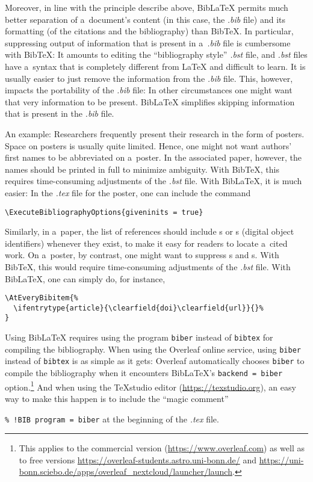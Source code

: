 \documentclass[12pt, a4paper, oneside]{article}
\newlength{\smalllinespacing}
\renewenvironment{quote}{%
	\par\list{}{%
		\leftmargin = \baselineskip%
		\rightmargin = \leftmargin%
		\baselineskip = \smalllinespacing%
	}
	\item\relax%
}{%
	\endlist%
}
\renewcommand{\caps}[1]{{\textscale{0.97}{\textls[50]{\MakeUppercase{#1}}}}}
\theoremstyle{Plain}
\theoremstyle{Definition}
\theoremstyle{Remark}
\begin{document}
Moreover, in line with the principle describe above, BibLaTeX permits much better separation of a~document's content (in this case, the \textit{.bib} file) and its formatting (of the citations and the bibliography) than BibTeX. In particular, suppressing output of information that is present in a~\textit{.bib} file is cumbersome with BibTeX: It amounts to editing the ``bibliography style'' \textit{.bst} file, and \textit{.bst} files have a~syntax that is completely different from LaTeX and difficult to learn. It is usually easier to just remove the information from the \textit{.bib} file. This, however, impacts the portability of the \textit{.bib} file: In other circumstances one might want that very information to be present. BibLaTeX simplifies skipping information that is present in the \textit{.bib} file.

An example: Researchers frequently present their research in the form of posters. Space on posters is usually quite limited. Hence, one might not want authors' first names to be abbreviated on a~poster. In the associated paper, however, the names should be printed in full to minimize ambiguity. With BibTeX, this requires time-consuming adjustments of the \textit{.bst} file. With BibLaTeX, it is much easier: In the \textit{.tex} file for the poster, one can include the command
\begin{quote}
	\verb|\ExecuteBibliographyOptions{giveninits = true}|
\end{quote}

Similarly, in a~paper, the list of references should include \caps{URL}s or \caps{DOI}s (digital object identifiers) whenever they exist, to make it easy for readers to locate a~cited work. On a~poster, by contrast, one might want to suppress \caps{DOI}s and \caps{URL}s. With BibTeX, this would require time-consuming adjustments of the \textit{.bst} file. With BibLaTeX, one can simply do, for instance,
\begin{quote}
\begin{verbatim}
\AtEveryBibitem{%
  \ifentrytype{article}{\clearfield{doi}\clearfield{url}}{}%
}
\end{verbatim}
\end{quote}

Using BibLaTeX requires using the program \verb|biber| instead of \verb|bibtex| for compiling the bibliography. When using the Overleaf online service, using \verb|biber| instead of \verb|bibtex| is as simple as it gets: Overleaf automatically chooses \verb|biber| to compile the bibliography when it encounters BibLaTeX's \verb|backend = biber| option.\footnote{This applies to the commercial version (\url{https://www.overleaf.com}) as well as to free versions \url{https://overleaf-students.astro.uni-bonn.de/} and \url{https://uni-bonn.sciebo.de/apps/overleaf_nextcloud/launcher/launch}.} And when using the TeXstudio editor (\url{https://texstudio.org}), an easy way to make this happen is to include the ``magic comment''
\begin{quote}
	\verb|% !BIB program = biber|
\end{quote}
at the beginning of the \textit{.tex} file.
\end{document}
